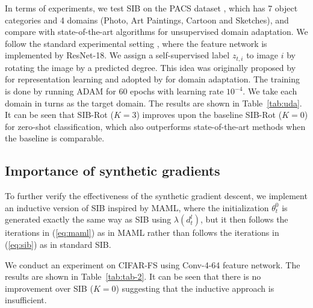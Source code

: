 \documentclass{article} \usepackage{iclr2020_conference,times}
\def\eqref#1{(\ref{#1})}
\newcommand{\supp}{l}
\begin{document}
In terms of experiments, we test SIB on the PACS dataset \citep{li2017deeper},
which has 7 object categories and 4 domains (Photo, Art Paintings, Cartoon and Sketches),
and compare with state-of-the-art algorithms
for unsupervised domain adaptation. 
We follow the standard experimental setting \citep{carlucci2019domain}, where 
the feature network is implemented by ResNet-18. 
We assign a self-supervised label $z_{t,i}$ to image $i$ by rotating the image
by a predicted degree. This idea was originally proposed by \citet{gidaris2018unsupervised} for representation learning
and adopted by \citet{xu2019self} for domain adaptation.
The training is done by running ADAM for $60$ epochs with learning rate $10^{-4}$.
We take each domain in turns as the target domain. The results are shown in Table~\ref{tab:uda}.
It can be seen that SIB-Rot ($K=3$) improves upon the baseline SIB-Rot ($K=0$) for zero-shot classification,
which also outperforms state-of-the-art methods when the baseline is comparable.



\subsection{Importance of synthetic gradients}
To further verify the effectiveness of the synthetic gradient descent,
we implement an inductive version of SIB inspired by MAML,
where the initialization $\theta_t^0$ is generated exactly the same way as SIB using $\lambda(d_t^\supp)$,
but it then follows the iterations in \eqref{eq:maml} as in MAML rather than follows the iterations in \eqref{eq:sib}
as in standard SIB.

We conduct an experiment on CIFAR-FS using Conv-4-64 feature network.
The results are shown in Table~\ref{tab:tab-2}.
It can be seen that there is no improvement over SIB ($K=0$) 
suggesting that the inductive approach is insufficient.
\end{document}
